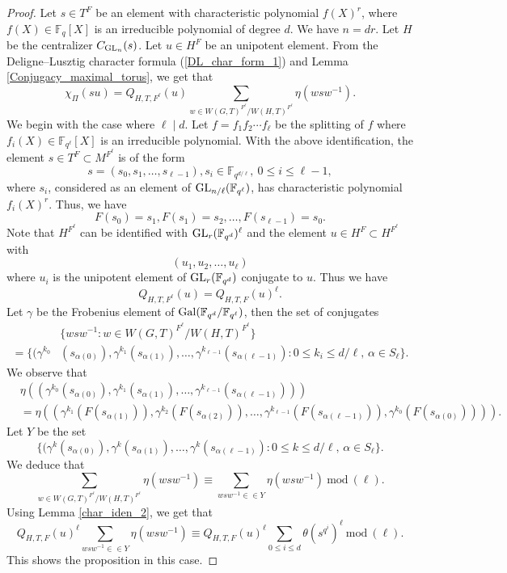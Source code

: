 \documentclass[10pt, reqno]{amsart}
\theoremstyle{plain}
\numberwithin{equation}{section} \newcommand{\di}{\operatorname{dim}}
\begin{document}
\begin{proof}
Let $s\in T^F$ be an element with characteristic polynomial $f(X)^r$,
where $f(X)\in \mathbb{F}_q[X]$ is an irreducible polynomial of degree
$d$. We have $n=dr$. Let $H$ be the centralizer $C_{{\rm GL}_n}(s)$.
Let $u\in H^F$ be an unipotent element.  From the Deligne--Lusztig
character formula (\ref{DL_char_form_1}) and Lemma
\ref{Conjugacy_maximal_torus}, we get that
$$\chi_{\Pi}(su)=Q_{H, T, F^\ell}(u)
\sum_{w\in W(G, T)^{F^\ell}/W(H, T)^{F^\ell}}\eta(wsw^{-1}).$$
We begin with the case where $\ell\mid d$. 
Let $f=f_1f_2\cdots f_\ell$ be the
splitting of $f$ where $f_i(X)\in \mathbb{F}_{q^\ell}[X]$ is an 
irreducible polynomial. With the above identification, the 
element $s\in T^F\subset M^{F^\ell}$ is of the form 
$$s=(s_0,s_1,\dots, s_{\ell-1}), s_i\in \mathbb{F}_{q^{d/\ell}},\ 0\leq i\leq \ell-1,$$
where $s_i$, considered as an element of ${\rm GL}_{n/\ell}(\mathbb{F}_{q^\ell})$,
has characteristic polynomial $f_i(X)^r$. Thus, we have 
$$F(s_0)=s_1, F(s_1)=s_2,\dots, F(s_{\ell-1})=s_0.$$
Note that $H^{F^\ell}$ can be identified with 
${\rm GL}_r(\mathbb{F}_{q^d})^\ell$ and 
the element $u\in H^{F}\subset H^{F^\ell}$ with 
$$(u_1, u_2,\dots, u_\ell)$$
where $u_i$ is the unipotent element of
${\rm GL}_{r}(\mathbb{F}_{q^{d}})$ conjugate to $u$.  Thus we have
$$Q_{H, T, F^\ell}(u)=Q_{H, T, F}(u)^\ell.$$
Let $\gamma$ be the Frobenius element of
${\rm Gal}(\mathbb{F}_{q^d}/\mathbb{F}_{q^\ell})$, then the set of
conjugates
\begin{align*}
    &\{wsw^{-1}:w\in W(G, T)^{F^\ell}/W(H, T)^{F^\ell}\}\\
  =\{(\gamma^{k_0}&(s_{\alpha(0)}),\gamma^{k_1}(s_{\alpha(1)}),\dots,
                    \gamma^{k_{\ell-1}}(s_{\alpha(\ell-1)}) : 0\leq k_i\leq d/\ell,\, \alpha\in S_\ell
\}.
\end{align*}
We observe that 
\begin{align*}
   &\eta((\gamma^{k_0}(s_{\alpha(0)}),\gamma^{k_1}(s_{\alpha(1)}),\dots, 
\gamma^{k_{\ell-1}}(s_{\alpha(\ell-1)})))\\&=
\eta((\gamma^{k_1}(F(s_{\alpha(1)})),\gamma^{k_2}(F(s_{\alpha(2)})),\dots, 
\gamma^{k_{\ell-1}}(F(s_{\alpha(\ell-1)})), \gamma^{k_0}(F(s_{\alpha(0)})))). 
\end{align*}
Let $Y$ be the set 
$$\{(\gamma^{k}(s_{\alpha(0)}),\gamma^{k}(s_{\alpha(1)}),\dots, 
\gamma^k(s_{\alpha(\ell-1)}) : 0\leq k\leq d/\ell,\, \alpha\in S_\ell\}.$$
We deduce that 
$$\sum_{w\in W(G, T)^{F^\ell}/W(H, T)^{F^\ell}}\eta(wsw^{-1})\equiv
\sum_{wsw^{-1}\in \in Y}\eta(wsw^{-1})\ \text{mod}\ (\ell).$$
Using Lemma \ref{char_iden_2}, we get that 
$$Q_{H, T, F}(u)^\ell\sum_{wsw^{-1}\in \in Y}\eta(wsw^{-1})\equiv
Q_{H, T, F}(u)^\ell\sum_{0\leq i\leq d}\theta(s^{q^i})^{\ell}\ \text{mod}\ (\ell).$$
This shows the proposition in this case. 


\end{proof}
\end{document}
